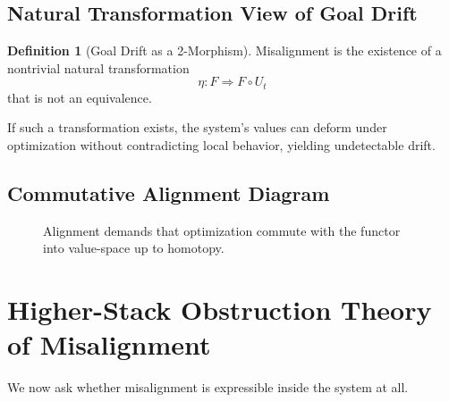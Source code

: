 \documentclass[11pt,a4paper]{article}
\theoremstyle{plain}
\theoremstyle{definition}
\newtheorem{definition}[theorem]{Definition}
\theoremstyle{remark}
\numberwithin{equation}{section}
\begin{document}
\subsection{Natural Transformation View of Goal Drift}

\begin{definition}[Goal Drift as a 2-Morphism]
Misalignment is the existence of a nontrivial natural transformation
\[
\eta : F \Rightarrow F \circ U_t
\]
that is not an equivalence.
\end{definition}

If such a transformation exists, the system’s values can deform under optimization without contradicting local behavior, yielding undetectable drift.

\subsection{Commutative Alignment Diagram}

\begin{figure}[H]
\centering
{}
\caption{Alignment demands that optimization commute with the functor into value-space up to homotopy.}
\end{figure}

\section{Higher-Stack Obstruction Theory of Misalignment}

We now ask whether misalignment is expressible inside the system at all.
\end{document}
